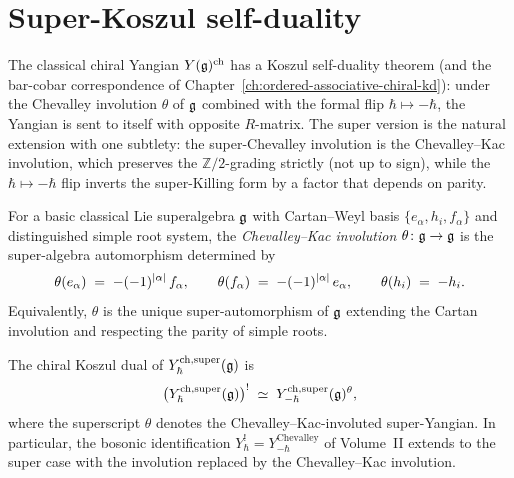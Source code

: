 \section{Super-Koszul self-duality}
\label{sec:super-koszul}

The classical chiral Yangian $Y(\mathfrak{g})^{\mathrm{ch}}$ has a Koszul self-duality
theorem (and the bar-cobar correspondence of
Chapter~\ref{ch:ordered-associative-chiral-kd}): under the Chevalley
involution $\theta$ of $\mathfrak{g}$ combined with the formal flip $\hbar\mapsto
-\hbar$, the Yangian is sent to itself with opposite $R$-matrix.
The super version is the natural extension with one subtlety: the
super-Chevalley involution is the Chevalley--Kac involution, which
preserves the $\mathbb{Z}/2$-grading strictly (not up to sign), while
the $\hbar\mapsto-\hbar$ flip inverts the super-Killing form by a factor
that depends on parity.

\begin{definition}
\label{def:chevalley-kac-involution}
For a basic classical Lie superalgebra $\mathfrak{g}$ with Cartan--Weyl basis
$\{e_\alpha, h_i, f_\alpha\}$ and distinguished simple root system, the
\emph{Chevalley--Kac involution} $\theta\colon \mathfrak{g}\to\mathfrak{g}$ is the
super-algebra automorphism determined by
\begin{equation}
 \label{eq:chevalley-kac}
 \theta(e_\alpha) \;=\; -(-1)^{|\alpha|}\,f_\alpha,\qquad
 \theta(f_\alpha) \;=\; -(-1)^{|\alpha|}\,e_\alpha,\qquad
 \theta(h_i) \;=\; -h_i.
\end{equation}
Equivalently, $\theta$ is the unique super-automorphism of $\mathfrak{g}$
extending the Cartan involution and respecting the parity of simple
roots.
\end{definition}

\begin{theorem}
\label{thm:super-yangian-koszul-dual}
The chiral Koszul dual of $Y^{\mathrm{ch},\mathrm{super}}_{\hbar}(\mathfrak{g})$ is
\begin{equation}
 \label{eq:super-koszul-dual}
 \bigl(Y^{\mathrm{ch},\mathrm{super}}_{\hbar}(\mathfrak{g})\bigr)^{!} \;\simeq\; Y^{\mathrm{ch},\mathrm{super}}_{-\hbar}(\mathfrak{g})^{\theta},
\end{equation}
where the superscript $\theta$ denotes the Chevalley--Kac-involuted
super-Yangian. In particular, the bosonic identification
$Y_\hbar^! = Y_{-\hbar}^{\mathrm{Chevalley}}$ of Volume~II extends to
the super case with the involution replaced by the Chevalley--Kac
involution.
\end{theorem}


